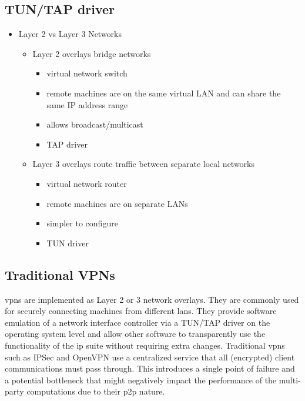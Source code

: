\hypertarget{thesis__020-related-work.md__tuntap-driver}{%
\subsection{TUN/TAP
driver}\label{thesis__020-related-work.md__tuntap-driver}}

\begin{itemize}
\tightlist
\item
  Layer 2 vs Layer 3 Networks

  \begin{itemize}
  \tightlist
  \item
    Layer 2 overlays bridge networks

    \begin{itemize}
    \tightlist
    \item
      virtual network switch
    \item
      remote machines are on the same virtual LAN and can share the same
      IP address range
    \item
      allows broadcast/multicast
    \item
      TAP driver
    \end{itemize}
  \item
    Layer 3 overlays route traffic between separate local networks

    \begin{itemize}
    \tightlist
    \item
      virtual network router
    \item
      remote machines are on separate LANs
    \item
      simpler to configure
    \item
      TUN driver
    \end{itemize}
  \end{itemize}
\end{itemize}

\hypertarget{thesis__020-related-work.md__traditional-vpns}{%
\subsection{Traditional
VPNs}\label{thesis__020-related-work.md__traditional-vpns}}

\glspl{vpn} are implemented as Layer 2 or 3 network overlays. They are
commonly used for securely connecting machines from different
\glspl{lan}. They provide software emulation of a network interface
controller via a TUN/TAP driver on the operating system level and allow
other software to transparently use the functionality of the \gls{ip}
suite without requiring extra changes. Traditional \glspl{vpn} such as
IPSec \autocite{ipSecDocs} and OpenVPN \autocite{openVPNDocs} use a
centralized service that all (encrypted) client communications must pass
through. This introduces a single point of failure and a potential
bottleneck that might negatively impact the performance of the
multi-party computations due to their \gls{p2p} nature.

